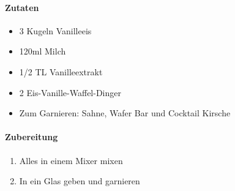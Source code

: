 \newpage
{}
\paragraph{Zutaten}
\begin{itemize}[noitemsep]
	\item 3 Kugeln Vanilleeis
	\item 120ml Milch
	\item 1/2 TL Vanilleextrakt
	\item 2 Eis-Vanille-Waffel-Dinger
	\item Zum Garnieren: Sahne, Wafer Bar und Cocktail Kirsche
\end{itemize}
\paragraph{Zubereitung}
\begin{enumerate}[noitemsep]
	\item Alles in einem Mixer mixen
	\item In ein Glas geben und garnieren
\end{enumerate}